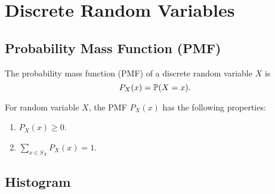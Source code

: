 \chapter{Discrete Random Variables}

\section{Probability Mass Function (PMF)}
\begin{definition}
    The probability mass function (PMF) of a discrete random variable $X$ is
    \begin{equation*}
        P_X(x) = \P{X=x}.
    \end{equation*}
\end{definition}

\begin{theorem}
    For random variable $X$, the PMF $P_X(x)$ has the following properties:
    \begin{enumerate}
        \item $P_X(x)\geq 0$.
        \item $\sum_{x\in S_X}P_X(x)=1$.
    \end{enumerate}
\end{theorem}

\section{Histogram}

